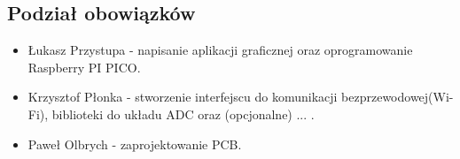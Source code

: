 


\subsection{Podział obowiązków}
    \begin{itemize}
        \item Łukasz Przystupa  - napisanie aplikacji graficznej oraz oprogramowanie Raspberry PI PICO.
        \item Krzysztof Płonka  - stworzenie interfejscu do komunikacji bezprzewodowej(Wi-Fi),
        biblioteki do układu ADC oraz (opcjonalne) ... . %
        \item Paweł Olbrych     - zaprojektowanie PCB.
    \end{itemize}
